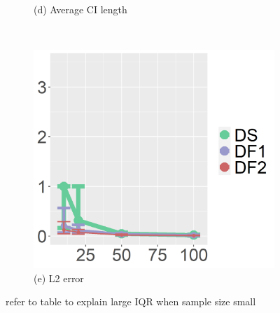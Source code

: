 \begin{figure}[ht!]
\begin{subfigure}[b]{.40\columnwidth}
    \caption{(d) Average CI length}
\end{subfigure}
\\
\centering
\begin{subfigure}[b]{.40\columnwidth} 
    \includegraphics[width=\columnwidth]{../../plot/L2_1_IQR.png}
    \caption{(e) L2 error}
\end{subfigure}
\hfill
\caption{refer to table to explain large IQR when sample size small}
\label{fig:IQR}
\end{figure}

